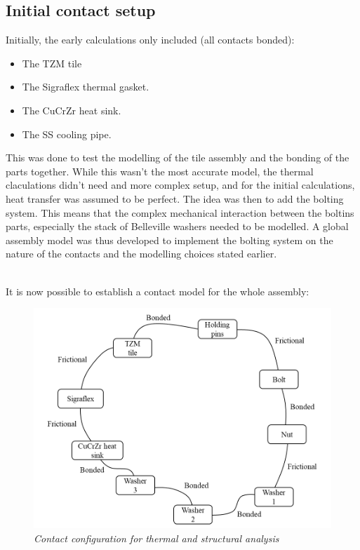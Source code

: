 \subsection{Initial contact setup}
\normalsize{Initially, the early calculations only included (all contacts bonded):
\begin{itemize}
    \item The \acrshort{TZM} tile
    \item The \acrshort{Sigraflex} thermal gasket.
    \item The \acrshort{CuCrZr} heat sink.
    \item The \acrshort{SS} cooling pipe.
  \end{itemize}
This was done to test the modelling of the tile assembly and the bonding of the parts together. While this wasn't the most accurate model, the thermal claculations didn't need and more complex setup, and for the initial calculations, heat transfer was assumed to be perfect. The idea was then to add the bolting system. This means that the complex mechanical interaction between the boltins parts, especially the stack of Belleville washers needed to be modelled. A global assembly model was thus developed to implement the bolting system on the nature of the contacts and the modelling choices stated earlier.}
\\
\break
\normalsize{\indent It is now possible to establish a contact model for the whole assembly:}
\\
\break
\begin{figure}[h!]
  \label{fig_4_1_0} 
  \centering
  \includegraphics[width=.9\textwidth]{figures/contacts.png}
  \caption{\it Contact configuration for thermal and structural analysis}
\end{figure}
